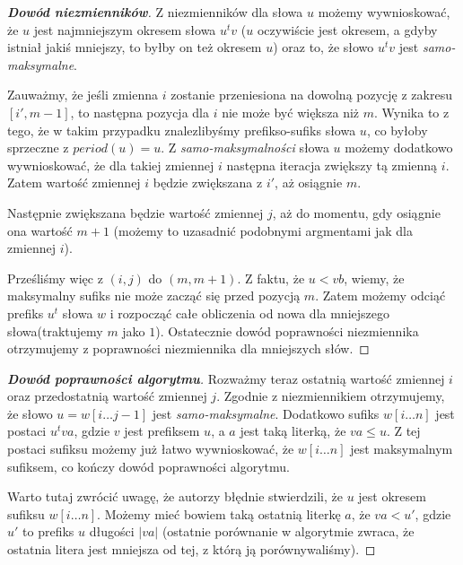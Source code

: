 \documentclass{article}
\begin{document}
\begin{proof}[\textbf{Dowód niezmienników}]
Z niezmienników dla słowa $u$ możemy wywnioskować, że $u$ jest najmniejszym okresem słowa $u^tv$ ($u$ oczywiście jest okresem, a gdyby istniał jakiś mniejszy, to byłby on też okresem $u$) 
oraz to, że słowo $u^tv$ jest \textit{samo-maksymalne}. 

Zauważmy, że jeśli zmienna $i$ zostanie przeniesiona na dowolną pozycję z zakresu $[i', m-1]$, to następna pozycja dla $i$ nie może być większa niż $m$.
Wynika to z tego, że w takim przypadku znalezlibyśmy prefikso-sufiks słowa $u$, co byłoby sprzeczne z
$period(u) = u$. Z \textit{samo-maksymalności} słowa $u$ możemy dodatkowo wywnioskować, że dla takiej zmiennej $i$
następna iteracja zwiększy tą zmienną $i$. Zatem wartość zmiennej $i$ będzie zwiększana z $i'$, aż osiągnie $m$.

Następnie zwiększana będzie wartość zmiennej $j$, aż do momentu, gdy osiągnie ona wartość $m+1$ (możemy to 
uzasadnić podobnymi argmentami jak dla zmiennej $i$). 

Prześliśmy więc z $(i, j)$ do $(m, m+1)$. Z faktu, że $u < vb$, wiemy, że maksymalny sufiks 
nie może zacząć się przed pozycją $m$. Zatem 
możemy odciąć prefiks $u^t$ słowa $w$ i rozpocząć całe obliczenia od nowa dla mniejszego słowa(traktujemy $m$ jako $1$).
Ostatecznie dowód poprawności niezmiennika otrzymujemy z poprawności niezmiennika dla mniejszych słów.
\end{proof}

\begin{proof}[\textbf{Dowód poprawności algorytmu}]
Rozważmy teraz ostatnią wartość zmiennej $i$ oraz przedostatnią wartość zmiennej $j$.
Zgodnie z niezmiennikiem otrzymujemy, że słowo $u = w[i\ldots j-1]$ jest \textit{samo-maksymalne}.
Dodatkowo sufiks $w[i\ldots n]$ jest postaci $u^tva$, gdzie $v$ jest prefiksem $u$, a $a$ jest taką literką, że $va \leq u$. 
Z tej postaci sufiksu możemy już łatwo wywnioskować, że $w[i\ldots n]$  jest maksymalnym sufiksem, co kończy dowód poprawności algorytmu.

Warto tutaj zwrócić uwagę, że autorzy błędnie stwierdzili, że $u$ jest okresem sufiksu $w[i\ldots n]$. Możemy mieć bowiem
taką ostatnią literkę $a$, że $va < u'$, gdzie $u'$ to prefiks $u$ długości $|va|$ (ostatnie porównanie w algorytmie zwraca, że ostatnia litera jest mniejsza od tej, z którą ją porównywaliśmy).
\end{proof}
\end{document}
